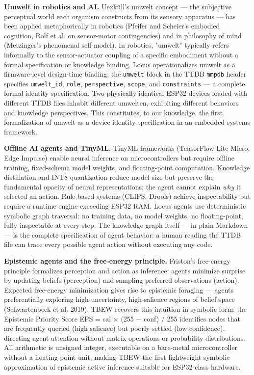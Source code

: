 \documentclass[11pt]{article}
\begin{document}
\textbf{Umwelt in robotics and AI.} Uexküll's umwelt concept --- the subjective perceptual world each organism constructs from its sensory apparatus --- has been applied metaphorically in robotics (Pfeifer and Scheier's embodied cognition, Rolf et al. on sensor-motor contingencies) and in philosophy of mind (Metzinger's phenomenal self-model). In robotics, "umwelt" typically refers informally to the sensor-actuator coupling of a specific embodiment without a formal specification or knowledge binding. Locus operationalizes umwelt as a firmware-level design-time binding: the \texttt{umwelt} block in the TTDB \texttt{mmpdb} header specifies \texttt{umwelt\_id}, \texttt{role}, \texttt{perspective}, \texttt{scope}, and \texttt{constraints} --- a complete formal identity specification. Two physically identical ESP32 devices loaded with different TTDB files inhabit different umwelten, exhibiting different behaviors and knowledge perspectives. This constitutes, to our knowledge, the first formalization of umwelt as a device identity specification in an embedded systems framework.

\textbf{Offline AI agents and TinyML.} TinyML frameworks (TensorFlow Lite Micro, Edge Impulse) enable neural inference on microcontrollers but require offline training, fixed-schema model weights, and floating-point computation. Knowledge distillation and INT8 quantization reduce model size but preserve the fundamental opacity of neural representations: the agent cannot explain \emph{why} it selected an action. Rule-based systems (CLIPS, Drools) achieve inspectability but require a runtime engine exceeding ESP32 RAM. Locus agents use deterministic symbolic graph traversal: no training data, no model weights, no floating-point, fully inspectable at every step. The knowledge graph itself --- in plain Markdown --- is the complete specification of agent behavior: a human reading the TTDB file can trace every possible agent action without executing any code.

\textbf{Epistemic agents and the free-energy principle.} Friston's free-energy principle formalizes perception and action as inference: agents minimize surprise by updating beliefs (perception) and sampling preferred observations (action). Expected free-energy minimization gives rise to epistemic foraging --- agents preferentially exploring high-uncertainty, high-salience regions of belief space (Schwartenbeck et al. 2019). TBEW recovers this intuition in symbolic form: the Epistemic Priority Score EPS = sal $\times$ (255 $-$ conf) / 255 identifies nodes that are frequently queried (high salience) but poorly settled (low confidence), directing agent attention without matrix operations or probability distributions. All arithmetic is unsigned integer, executable on a bare-metal microcontroller without a floating-point unit, making TBEW the first lightweight symbolic approximation of epistemic active inference suitable for ESP32-class hardware.
\end{document}
